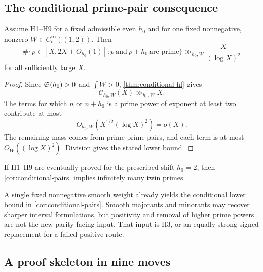 \subsection{The conditional prime-pair consequence}

\begin{corollary}
\label{cor:conditional-pairs}
Assume H1--H9 for a fixed admissible even \(h_0\) and for one fixed
nonnegative, nonzero \(W\in C_c^\infty((1,2))\).  Then
\[
\#\{p\in[X,2X+O_{h_0}(1)]:
      p\ \text{and}\ p+h_0\ \text{are prime}\}
\gg_{h_0,W}\frac{X}{(\log X)^2}
\]
for all sufficiently large \(X\).
\end{corollary}

\begin{proof}
Since \(\mathfrak S(h_0)>0\) and \(\int W>0\),
\cref{thm:conditional-hl} gives
\[
\mathcal C_{h_0,W}(X)\gg_{h_0,W}X.
\]
The terms for which \(n\) or \(n+h_0\) is a prime power of exponent
at least two contribute at most
\[
O_{h_0,W}\!\left(X^{1/2}(\log X)^2\right)=o(X).
\]
The remaining mass comes from prime-prime pairs, and each term is at
most \(O_W((\log X)^2)\).  Division gives the stated lower bound.
\end{proof}

\begin{corollary}[\Ctag\ Conditional \(h_0=2\) specialization]
\label{cor:conditional-twins}
If H1--H9 are eventually proved for the prescribed shift \(h_0=2\),
then \cref{cor:conditional-pairs} implies infinitely many twin primes.
\end{corollary}

\begin{remark}
A single fixed nonnegative smooth weight already yields the
conditional lower bound in \cref{cor:conditional-pairs}.  Smooth
majorants and minorants may recover sharper interval formulations,
but positivity and removal of higher prime powers are not the new
parity-facing input.  That input is H3, or an equally strong signed
replacement for a failed positive route.
\end{remark}

\subsection{A proof skeleton in nine moves}

